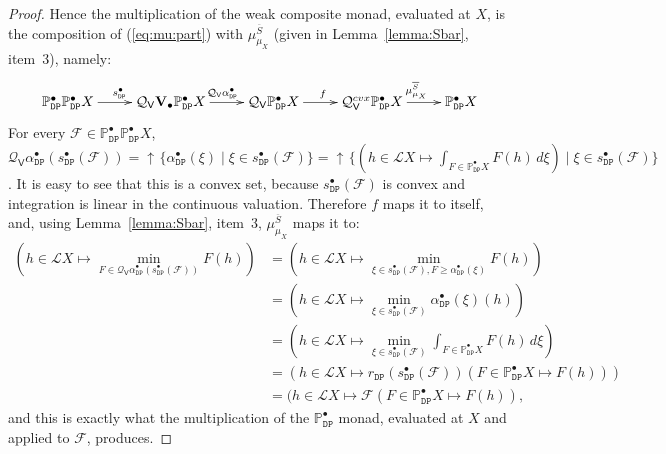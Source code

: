 \documentclass[preprint,12pt]{elsarticle}
\DeclareMathOperator{\upc}{\uparrow\!}
\newcommand\Lform{\mathcal L}
\newcommand\Pred{\mathbb{P}}
\newcommand\Demon{{\mathtt{D}}}
\newcommand\Nature{{\mathtt{P}}}
\newcommand\DN{{\Demon\Nature}}
\newcommand\Smyth{{\mathcal Q}}
\newcommand\Vt{\mathsf{V}}
\newcommand\SV{\Smyth_{\Vt}}
\newcommand\Val{{\mathbf V}}
\begin{document}
\begin{proof}
  Hence the multiplication of the weak composite monad, evaluated at
  $X$, is the composition of (\ref{eq:mu:part}) with $\mu^{\overline
    S}_{\mu_X}$ (given in Lemma~\ref{lemma:Sbar}, item~3), namely:
  \begin{equation}
    \label{eq:Sbarmu}
    \xymatrix{ 
      \Pred_\DN^\bullet {\Pred_\DN^\bullet X}
      \ar[r]^{s_\DN^\bullet}
      & \SV {\Val_\bullet {\Pred_\DN^\bullet X}}
      \ar[r]^{\SV {\alpha_\DN^\bullet}}
      & \SV {\Pred_\DN^\bullet X}
      \ar[r]^f
      & \SV^{cvx} {\Pred_\DN^\bullet X}
      \ar[r]^{\mu^{\overline S}_{\mu_X}}
      & \Pred_\DN^\bullet X
      }
  \end{equation}
  For every $\mathcal F \in \Pred_\DN^\bullet {\Pred_\DN^\bullet X}$,
  $\SV {\alpha_\DN^\bullet} (s_\DN^\bullet (\mathcal F)) = \upc
  \{\alpha_\DN^\bullet (\xi) \mid \xi \in s_\DN^\bullet (\mathcal F)\}
  = \upc \{(h \in \Lform X \mapsto \int_{F \in \Pred_\DN^\bullet X} F
  (h) \,d\xi) \mid \xi \in s_\DN^\bullet (\mathcal F)\}$.  It is easy
  to see that this is a convex set, because
  $s_\DN^\bullet (\mathcal F)$ is convex and integration is linear in
  the continuous valuation.  Therefore $f$ maps it to itself, and,
  using Lemma~\ref{lemma:Sbar}, item~3, $\mu^{\overline S}_{\mu_X}$
  maps it to:
  \begin{align*}
    (h \in \Lform X \mapsto \min_{F \in \SV {\alpha_\DN^\bullet}
    (s_\DN^\bullet (\mathcal F))} F (h))
    & = (h \in \Lform X \mapsto \min_{\xi \in s_\DN^\bullet (\mathcal
      F), F \geq \alpha_\DN^\bullet (\xi)} F (h)) \\
    & = (h \in \Lform X \mapsto \min_{\xi \in s_\DN^\bullet (\mathcal
      F)} \alpha_\DN^\bullet (\xi) (h)) \\
    & = (h \in \Lform X \mapsto \min_{\xi \in s_\DN^\bullet (\mathcal
      F)} \int_{F \in \Pred_\DN^\bullet X} F (h) \,d\xi) \\
    & = (h \in \Lform X \mapsto  r_\DN (s_\DN^\bullet (\mathcal F)) (F \in \Pred_\DN^\bullet X
      \mapsto F (h))) \\
    & = (h \in \Lform X \mapsto  \mathcal F (F \in \Pred_\DN^\bullet X
      \mapsto F (h)),
  \end{align*}
  and this is exactly what the multiplication of the
  $\Pred_\DN^\bullet$ monad, evaluated at $X$ and applied to $\mathcal
  F$, produces.
%

\end{proof}
\end{document}
